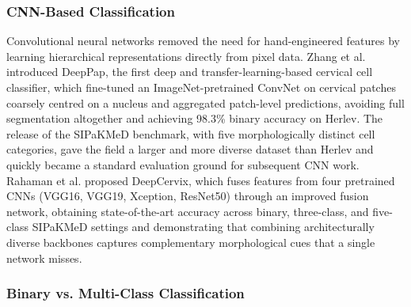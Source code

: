 \documentclass[pdflatex,sn-nature]{sn-jnl}%
\theoremstyle{thmstyleone}%
\theoremstyle{thmstyletwo}%
\theoremstyle{thmstylethree}%
\begin{document}
\subsubsection{CNN-Based Classification}

Convolutional neural networks removed the need for hand-engineered features by learning hierarchical representations directly from pixel data. Zhang et al.\cite{Lite35} introduced DeepPap, the first deep and transfer-learning-based cervical cell classifier, which fine-tuned an ImageNet-pretrained ConvNet on cervical patches coarsely centred on a nucleus and aggregated patch-level predictions, avoiding full segmentation altogether and achieving 98.3\% binary accuracy on Herlev. The release of the SIPaKMeD benchmark\cite{Lite38}, with five morphologically distinct cell categories, gave the field a larger and more diverse dataset than Herlev and quickly became a standard evaluation ground for subsequent CNN work. Rahaman et al.\cite{Lite39} proposed DeepCervix, which fuses features from four pretrained CNNs (VGG16, VGG19, Xception, ResNet50) through an improved fusion network, obtaining state-of-the-art accuracy across binary, three-class, and five-class SIPaKMeD settings and demonstrating that combining architecturally diverse backbones captures complementary morphological cues that a single network misses.

\subsubsection{Binary vs. Multi-Class Classification}

\end{document}
